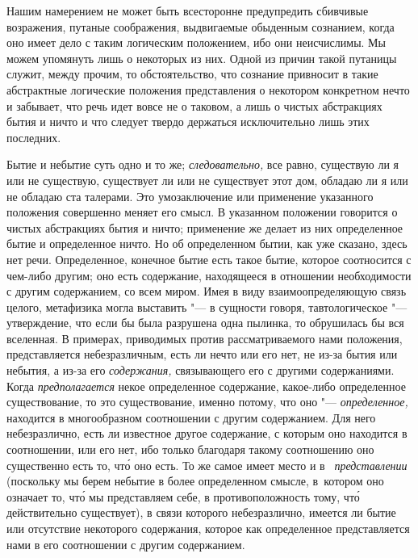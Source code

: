 Нашим намерением не может быть всесторонне предупредить сбивчивые возражения,
путаные соображения, выдвигаемые обыденным сознанием, когда оно имеет дело с
таким логическим положением, ибо они неисчислимы. Мы можем упомянуть лишь о
некоторых из них. Одной из причин такой путаницы служит, между прочим, то
обстоятельство, что сознание привносит в такие абстрактные логические положения
представления о некотором конкретном нечто и забывает, что речь идет вовсе не о
таковом, а лишь о чистых абстракциях бытия и ничто и что следует твердо
держаться исключительно лишь этих последних.

Бытие и небытие суть одно и то же; {\em следовательно,} все равно, существую ли
я или не существую, существует ли или не существует этот дом, обладаю ли я или
не обладаю ста талерами. Это умозаключение или применение указанного положения
совершенно меняет его смысл. В указанном положении говорится о чистых
абстракциях бытия и ничто; применение же делает из них определенное бытие и
определенное ничто. Но об определенном бытии, как уже сказано, здесь нет речи.
Определенное, конечное бытие есть такое бытие, которое соотносится с чем-либо
другим; оно есть содержание, находящееся в отношении необходимости с другим
содержанием, со всем миром. Имея в виду взаимоопределяющую связь целого,
метафизика могла выставить "--- в сущности говоря, тавтологическое "---
утверждение, что если бы была разрушена одна пылинка, то обрушилась бы вся
вселенная. В примерах, приводимых против рассматриваемого нами положения,
представляется небезразличным, есть ли нечто или его нет, не из-за бытия или
небытия, а из-за его {\em содержания,} связывающего его с другими содержаниями.
Когда {\em предполагается} некое определенное содержание, какое-либо
определенное существование, то это существование, именно потому, что оно "---
{\em определенное,} находится в многообразном соотношении с другим содержанием.
Для него небезразлично, есть ли известное другое содержание, с которым оно
находится в соотношении, или его нет, ибо только благодаря такому соотношению
оно существенно есть то, чт\'{о} оно есть. То же самое имеет место и в~{\em
представлении} (поскольку мы берем небытие в более определенном смысле,
в~котором оно означает то, чт\'{о} мы представляем себе, в противоположность
тому, чт\'{о} действительно существует), в связи которого небезразлично,
имеется ли бытие или отсутствие некоторого содержания, которое как определенное
представляется нами в его соотношении с другим содержанием. \label{bkm:bm85a}

